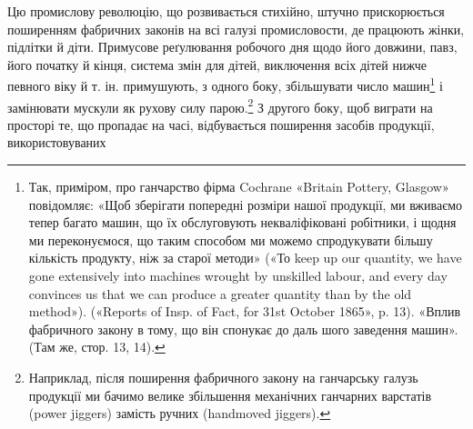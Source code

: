Цю промислову революцію, що розвивається стихійно, штучно
прискорюється поширенням фабричних законів на всі галузі
промисловости, де працюють жінки, підлітки й діти. Примусове
реґулювання робочого дня щодо його довжини, павз, його початку
й кінця, система змін для дітей, виключення всіх дітей нижче
певного віку й т. ін. примушують, з одного боку, збільшувати
число машин\footnote{
Так, приміром, про ганчарство фірма Cochrane «Britain Pottery,
Glasgow» повідомляє: «Щоб зберігати попередні розміри нашої продукції,
ми вживаємо тепер багато машин, що їх обслуговують некваліфіковані робітники,
і щодня ми переконуємося, що таким способом ми можемо спродукувати
більшу кількість продукту, ніж за старої методи» («То keep up
our quantity, we have gone extensively into machines wrought by unskilled
labour, and every day convinces us that we can produce a greater quantity
than by the old method»). («Reports of Insp. of Fact, for 31st October
1865», p. 13). «Вплив фабричного закону в тому, що він спонукає до даль
шого заведення машин». (Там же, стор. 13, 14).
} і замінювати мускули як рухову силу парою.\footnote{
Наприклад, після поширення фабричного закону на ганчарську
галузь продукції ми бачимо велике збільшення механічних ганчарних
варстатів (power jiggers) замість ручних (handmoved jiggers).
}
З другого боку, щоб виграти на просторі те, що пропадає на часі,
відбувається поширення засобів продукції, використовуваних
\parbreak{}  %
